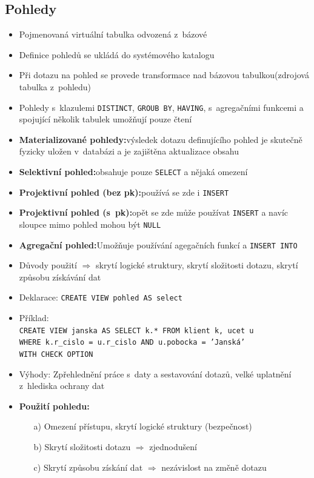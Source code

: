 \documentclass[a4paper,10pt]{article}
\newcommand{\pojem}[2]{\item \textbf{#1:}\quad #2}
\newcommand{\tedy}{$\Rightarrow$ }
\begin{document}
		\subsection{Pohledy}
			\begin{itemize}
				\item Pojmenovaná virtuální tabulka odvozená z~bázové
				\item Definice pohledů se ukládá do systémového katalogu
				\item Při dotazu na pohled se provede transformace nad bázovou tabulkou(zdrojová tabulka z~pohledu)
				\item Pohledy s~klazulemi \texttt{DISTINCT}, \texttt{GROUB BY}, \texttt{HAVING}, s~agregačními funkcemi a spojující několik tabulek umožňují pouze čtení

				\pojem{Materializované pohledy}{výsledek dotazu definujícího pohled je skutečně fyzicky uložen v~databázi a je zajištěna aktualizace obsahu}
				\pojem{Selektivní pohled}{obsahuje pouze \texttt{SELECT} a nějaká omezení}
				\pojem{Projektivní pohled (bez pk)}{používá se zde i \texttt{INSERT}}
				\pojem{Projektivní pohled (s~pk)}{opět se zde může používat \texttt{INSERT} a navíc sloupce mimo pohled mohou být \texttt{NULL}}
				\pojem{Agregační pohled}{Umožňuje  používání agegačních funkcí a \texttt{INSERT INTO}}
				
				\item Důvody použití \tedy skrytí logické struktury, skrytí složitosti dotazu, skrytí způsobu získávání dat
				\item Deklarace: \texttt{CREATE VIEW pohled AS select}
				\item Příklad: \\ \texttt{CREATE VIEW janska AS SELECT k.* FROM klient k, ucet u} \\
					\texttt{WHERE k.r\_cislo = u.r\_cislo AND u.pobocka = 'Janská'} \\
					\texttt{WITH CHECK OPTION} \\
				\item Výhody: Zpřehlednění práce s~daty a sestavování dotazů, velké uplatnění z~hlediska ochrany dat
				\pojem{Použití pohledu}
				\begin{itemize}
					\item[a)] Omezení přístupu, skrytí logické struktury (bezpečnost)
					\item[b)] Skrytí složitosti dotazu \tedy zjednodušení
					\item[c)] Skrytí způsobu získání dat \tedy nezávislost na změně dotazu
				\end{itemize}
			\end{itemize}
\end{document}
